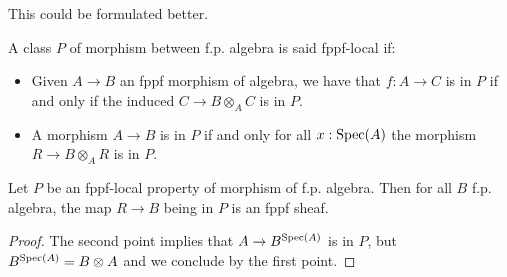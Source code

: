 This could be formulated better.

\begin{definition}
A class $P$ of morphism between f.p. algebra is said fppf-local if:
\begin{itemize} 
\item Given $A\to B$ an fppf morphism of algebra, we have that $f:A\to C$ is in $P$ if and only if the induced $C\to B\otimes_AC$ is in $P$.
\item A morphism $A\to B$ is in $P$ if and only for all $x:\operatorname{Spec}(A)$ the morphism $R\to B\otimes_AR$ is in $P$.
\end{itemize}
\end{definition}

\begin{lemma}
Let $P$ be an fppf-local property of morphism of f.p. algebra. Then for all $B$ f.p. algebra, the map $R\to B$ being in $P$ is an fppf sheaf.
\end{lemma}

\begin{proof}
The second point implies that $A\to B^{\operatorname{Spec}(A)}$ is in $P$, but $B^{\operatorname{Spec}(A)} = B\otimes A$ and we conclude by the first point.
\end{proof}

